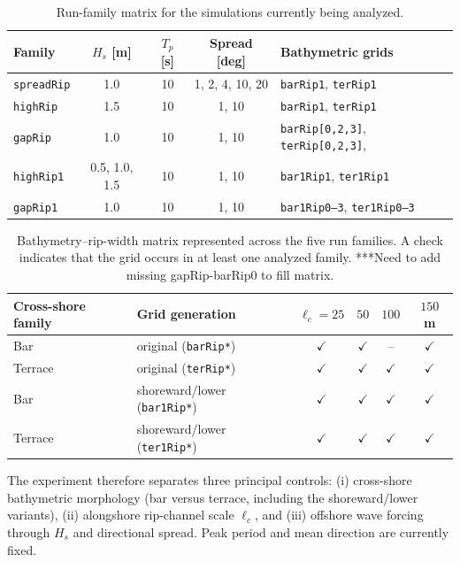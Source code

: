 \documentclass[11pt]{article}
\begin{document}
\begin{table}[htbp]
\centering
\caption{Run-family matrix for the simulations currently being
  analyzed.}
\label{tab:families}
\small
\begin{tabularx}{\textwidth}{l c c c X}
\toprule
Family & $H_s$ [m] & $T_p$ [s] & Spread [deg] & Bathymetric grids\\
\midrule
\texttt{spreadRip} & 1.0 & 10 & 1, 2, 4, 10, 20 & \texttt{barRip1}, \texttt{terRip1}\\
\texttt{highRip}   & 1.5 & 10 & 1, 10 & \texttt{barRip1}, \texttt{terRip1}\\
\texttt{gapRip}    & 1.0 & 10 & 1, 10 & \texttt{barRip[0,2,3]}, \texttt{terRip[0,2,3]},\\
\texttt{highRip1}  & 0.5, 1.0, 1.5 & 10 & 1, 10 & \texttt{bar1Rip1}, \texttt{ter1Rip1}\\
\texttt{gapRip1}   & 1.0 & 10 & 1, 10 & \texttt{bar1Rip0--3}, \texttt{ter1Rip0--3}\\
\bottomrule
\end{tabularx}
\end{table}

\begin{table}[htbp]
\centering
\caption{Bathymetry--rip-width matrix represented across the five run
  families. A check indicates that the grid occurs in at least one
  analyzed family. ***Need to add missing gapRip-barRip0 to fill matrix.}
\small
\begin{tabular}{llcccc}
\toprule
Cross-shore family & Grid generation & $\ell_c=25$ & $50$ & $100$ & $150$ m\\
\midrule
Bar     & original (\texttt{barRip*})  & $\checkmark$ & $\checkmark$ & -- & $\checkmark$\\
Terrace & original (\texttt{terRip*})  & $\checkmark$ & $\checkmark$ & $\checkmark$ & $\checkmark$\\
Bar     & shoreward/lower (\texttt{bar1Rip*}) & $\checkmark$ & $\checkmark$ & $\checkmark$ & $\checkmark$\\
Terrace & shoreward/lower (\texttt{ter1Rip*}) & $\checkmark$ & $\checkmark$ & $\checkmark$ & $\checkmark$\\
\bottomrule
\end{tabular}
\end{table}

The experiment therefore separates three principal controls: (i)
cross-shore bathymetric morphology (bar versus terrace, including the
shoreward/lower variants), (ii) alongshore rip-channel scale $\ell_c$,
and (iii) offshore wave forcing through $H_s$ and directional spread.
Peak period and mean direction are currently fixed.
\end{document}
